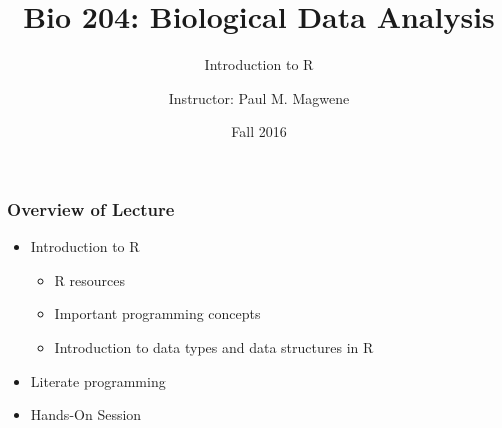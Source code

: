 \documentclass{beamer}
\title{Bio 204: Biological Data Analysis}
\subtitle{Introduction to R} %
\author[P. Magwene]{Instructor: Paul M. Magwene}
\date{Fall 2016}
\begin{document}
\begin{frame}
\titlepage
\end{frame}

\begin{frame}
  \frametitle{Overview of Lecture}

\begin{itemize}
		\item Introduction to R
		\begin{itemize}
			\item R resources
			\item Important programming concepts
			\item Introduction to data types and data structures in R 
		\end{itemize}
        \item Literate programming
		\item Hands-On Session
\end{itemize}

\end{frame}
\end{document}
